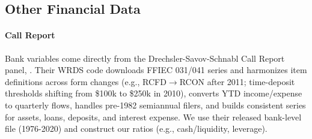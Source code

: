 \documentclass{article}
\begin{document}



\subsection{Other Financial Data}

\paragraph{Call Report}
Bank variables come directly from the Drechsler-Savov-Schnabl Call Report panel, \citep{Drechsler2017}. Their WRDS code downloads FFIEC 031/041 series and harmonizes item definitions across form changes (e.g., RCFD$\rightarrow$RCON after 2011; time-deposit thresholds shifting from \$100k to \$250k in 2010), converts YTD income/expense to quarterly flows, handles pre-1982 semiannual filers, and builds consistent series for assets, loans, deposits, and interest expense. We use their released bank-level file (1976-2020) and construct our ratios (e.g., cash/liquidity, leverage). 
\end{document}
